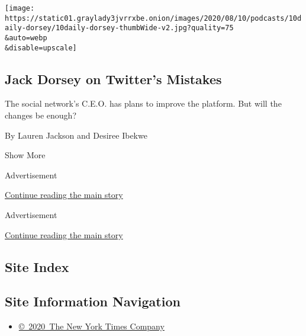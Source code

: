 \begin{enumerate}
  \texttt{[image: https://static01.graylady3jvrrxbe.onion/images/2020/08/10/podcasts/10daily-dorsey/10daily-dorsey-thumbWide-v2.jpg?quality=75\\\&auto=webp\\\&disable=upscale]}

  \hypertarget{jack-dorsey-on-twitters-mistakes}{%
  \subsection{Jack Dorsey on Twitter's
  Mistakes}\label{jack-dorsey-on-twitters-mistakes}}

  The social network's C.E.O. has plans to improve the platform. But
  will the changes be enough?

  By Lauren Jackson and Desiree Ibekwe
\end{enumerate}

Show More

Advertisement

\protect\hyperlink{after-mid5}{Continue reading the main story}

Advertisement

\protect\hyperlink{after-mktg}{Continue reading the main story}

\hypertarget{site-index}{%
\subsection{Site Index}\label{site-index}}

\hypertarget{site-information-navigation}{%
\subsection{Site Information
Navigation}\label{site-information-navigation}}

\begin{itemize}
\tightlist
\item
  \href{https://help.nytimes3xbfgragh.onion/hc/en-us/articles/115014792127-Copyright-notice}{©~2020~The
  New York Times Company}
\end{itemize}


